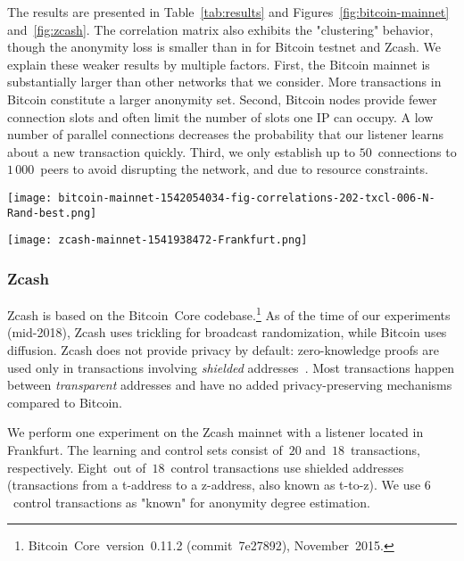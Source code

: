 The results are presented in Table~\ref{tab:results} and Figures~\ref{fig:bitcoin-mainnet} and~\ref{fig:zcash}.
The correlation matrix also exhibits the "clustering" behavior, though the anonymity loss is smaller than in for Bitcoin testnet and Zcash.
We explain these weaker results by multiple factors.
First, the Bitcoin mainnet is substantially larger than other networks that we consider.
More transactions in Bitcoin constitute a larger anonymity set.
Second, Bitcoin nodes provide fewer connection slots and often limit the number of slots one IP can occupy.
A low number of parallel connections decreases the probability that our listener learns about a new transaction quickly.
Third, we only establish up to $50$~connections to $1\,000$~peers to avoid disrupting the network, and due to resource constraints.

\begin{figure*}
	\centering
	\begin{minipage}{0.5\textwidth}
		\centering
		\texttt{[image: bitcoin-mainnet-1542054034-fig-correlations-202-txcl-006-N-Rand-best.png]}
		\caption{Transaction clustering for Bitcoin mainnet.}
		\label{fig:bitcoin-mainnet}
	\end{minipage}\hfill
	\begin{minipage}{0.5\textwidth}
		\centering
		\texttt{[image: zcash-mainnet-1541938472-Frankfurt.png]}
		\caption{Transaction clustering for Zcash.}
		\label{fig:zcash}
	\end{minipage}\hfill
\end{figure*}

\subsubsection{Zcash}

Zcash is based on the Bitcoin~Core codebase.\footnote{Bitcoin~Core~version~0.11.2 (commit~7e27892), November~2015.}
As of the time of our experiments (mid-2018), Zcash uses trickling for broadcast randomization, while Bitcoin uses diffusion.
Zcash does not provide privacy by default: zero-knowledge proofs are used only in transactions involving \textit{shielded} addresses~\cite{Kappos2018}.
Most transactions happen between \textit{transparent} addresses and have no added privacy-preserving mechanisms compared to Bitcoin.

We perform one experiment on the Zcash mainnet with a listener located in Frankfurt.
The learning and control sets consist of~$20$ and~$18$~transactions, respectively.
Eight~out of~$18$~control transactions use shielded addresses (transactions from a t-address to a z-address, also known as t-to-z).
We use $6$~control transactions as "known" for anonymity degree estimation.


